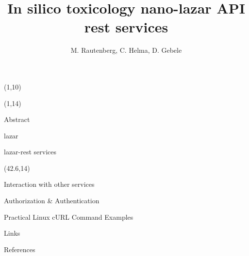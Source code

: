 \documentclass[final]{beamer}
\title{In silico toxicology nano-lazar API rest services}
\author{M. Rautenberg, C. Helma, D. Gebele}
\institute{\emph{in silico} toxicology gmbh, Basel, Switzerland}
\begin{document}
  \begin{frame}{}

    \begin{textblock}{80}(1,10)
        
    \end{textblock}

    \begin{textblock}{40.5}(1,14)
      \begin{block}{Abstract}
        \justifying
        
      \end{block}

      \begin{block}{lazar}
        \justifying
        
      \end{block}

      \begin{block}{lazar-rest services}
        \justifying
        
      \end{block}




    \end{textblock}

    \begin{textblock}{40.5}(42.6,14)

      \begin{block}{Interaction with other services}
        
      \end{block}

      \begin{block}{Authorization \& Authentication}
        \justifying        
        
      \end{block}

      \begin{block}{Practical Linux cURL Command Examples}
        
      \end{block}

      \begin{exampleblock}{Links}
        
      \end{exampleblock}

      \begin{block}{References}
        \justifying
        \small
      \end{block}

    \end{textblock}

  \end{frame}
\end{document}

